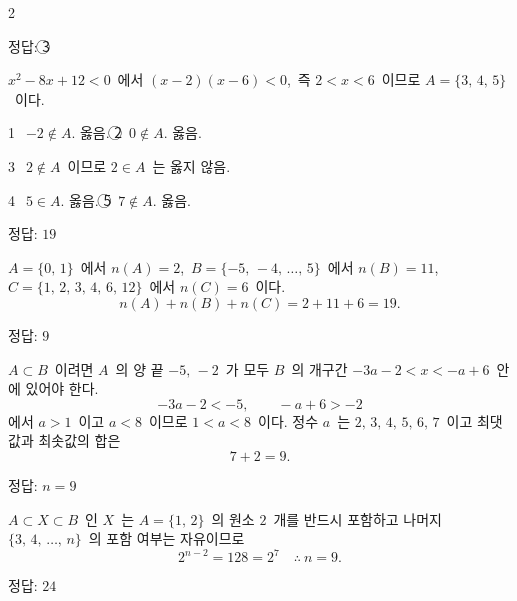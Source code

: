 \documentclass[10pt,fleqn]{article}
\begin{document}
\dmsoltitlefirsttrue
\begin{multicols*}{2}

\begin{dmanswerbox}
정답: \textcircled{\scriptsize 3}
\end{dmanswerbox}

$x^{2}-8x+12<0$\ 에서 $(x-2)(x-6)<0$,\ 즉 $2<x<6$\ 이므로 $A=\{3,\,4,\,5\}$\ 이다.

\vspace{3mm}
\textcircled{\scriptsize 1}\ $-2\notin A$. 옳음. \quad \textcircled{\scriptsize 2}\ $0\notin A$. 옳음.

\textcircled{\scriptsize 3}\ $2\notin A$\ 이므로 $2\in A$\ 는 옳지 않음.

\textcircled{\scriptsize 4}\ $5\in A$. 옳음. \quad \textcircled{\scriptsize 5}\ $7\notin A$. 옳음.

\begin{dmanswerbox}
정답: $19$
\end{dmanswerbox}

$A=\{0,\,1\}$\ 에서 $n(A)=2$,\ $B=\{-5,\,-4,\,\ldots,\,5\}$\ 에서 $n(B)=11$,\ $C=\{1,\,2,\,3,\,4,\,6,\,12\}$\ 에서 $n(C)=6$\ 이다.
\[ n(A)+n(B)+n(C)=2+11+6=19. \]

\begin{dmanswerbox}
정답: $9$
\end{dmanswerbox}

$A\subset B$\ 이려면 $A$\ 의 양 끝 $-5,\,-2$\ 가 모두 $B$\ 의 개구간 $-3a-2<x<-a+6$\ 안에 있어야 한다.
\[ -3a-2<-5,\qquad -a+6>-2 \]
에서 $a>1$\ 이고 $a<8$\ 이므로 $1<a<8$\ 이다. 정수 $a$\ 는 $2,\,3,\,4,\,5,\,6,\,7$\ 이고 최댓값과 최솟값의 합은
\[ 7+2=9. \]

\begin{dmanswerbox}
정답: $n=9$
\end{dmanswerbox}

$A\subset X\subset B$\ 인 $X$\ 는 $A=\{1,\,2\}$\ 의 원소 $2$\ 개를 반드시 포함하고 나머지 $\{3,\,4,\,\ldots,\,n\}$\ 의 포함 여부는 자유이므로
\[ 2^{n-2}=128=2^{7}\quad\therefore\ n=9. \]

\begin{dmanswerbox}
정답: $24$
\end{dmanswerbox}


\end{multicols*}
\end{document}
